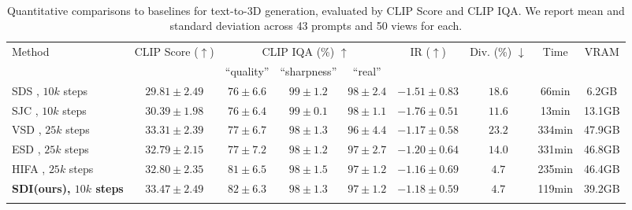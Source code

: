 \documentclass{article}
\newcommand{\ourmethod}{SDI}
\begin{document}
\begin{table}[h]
\centering
\caption{
    Quantitative comparisons to baselines for text-to-3D generation, evaluated by CLIP Score and CLIP IQA.
    We report mean and standard deviation across 43 prompts and 50 views for each.\vspace{-.15in}
}
\label{tab:comparison}
\
\begin{adjustbox}{width=\linewidth}

\begin{tabular}{@{}lcccccccc@{}}
    \toprule
    Method           & CLIP Score ($\uparrow$) & \multicolumn{3}{c}{CLIP IQA (\%) $\uparrow$} & IR ($\uparrow$)  & Div. (\%) $\downarrow$& Time & VRAM \\ \cmidrule(l){3-5}
                     &                         & ``quality'' & ``sharpness'' & ``real''       & & & &  \\ \midrule 
    SDS \cite{poole2022dreamfusion}, $10k$ steps         & $29.81 \pm 2.49$ & $76 \pm 6.6$  & $99 \pm 1.2$ & $98 \pm 2.4$ & $-1.51\pm0.83$ & $18.6$ & 66min & 6.2GB\\
    SJC \cite{wang2023score},  $10k$ steps               & $30.39 \pm 1.98$ & $76 \pm 6.4$  & $99 \pm 0.1$ & $98 \pm 1.1$ & $-1.76\pm0.51$ & $11.6$ & 13min & 13.1GB\\
    VSD \cite{wang2024prolificdreamer}, $25k$ steps      & $33.31 \pm 2.39$ & $77 \pm 6.7$  & $98 \pm 1.3$ & $96 \pm 4.4$ & $-1.17\pm0.58$ & $23.2$ & 334min & 47.9GB \\
    ESD \cite{wang2023taming}, $25k$ steps               & $32.79 \pm 2.15$ & $77 \pm 7.2$  & $98 \pm 1.2$ & $97 \pm 2.7$ & $-1.20\pm0.64$ & $14.0$ & 331min & 46.8GB\\
    HIFA \cite{zhu2023hifa}, $25k$ steps                 & $32.80 \pm 2.35$ & $81 \pm 6.5$  & $98 \pm 1.5$ & $97 \pm 1.2$ & $-1.16\pm0.69$ & $4.7$ & 235min & 46.4GB \\
    \textbf{\ourmethod(ours), $10k$ steps}               & $33.47 \pm 2.49$ & $82 \pm 6.3$  & $98 \pm 1.3$ & $97 \pm 1.2$ & $-1.18\pm0.59$ & $4.7$ & 119min & 39.2GB\\
    \bottomrule
    \vspace{-.15in}
\end{tabular}
\end{adjustbox}
\end{table}
\end{document}
